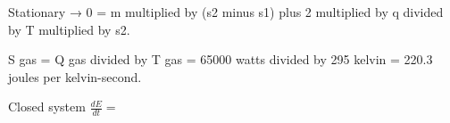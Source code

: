 Stationary → 0 = m multiplied by (s2 minus s1) plus 2 multiplied by q divided by T multiplied by s2.  

S gas = Q gas divided by T gas = 65000 watts divided by 295 kelvin = 220.3 joules per kelvin-second.

Closed system  
\( \frac{dE}{dt} = \)